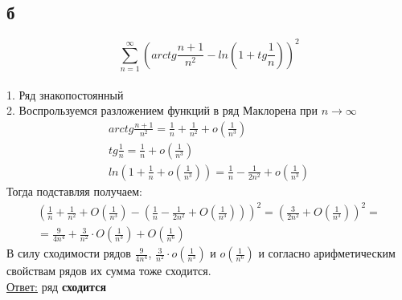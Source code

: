 \documentclass[a5paper, 10pt]{article}
\theoremstyle{definition}
\theoremstyle{plain}
\theoremstyle{remark}
\begin{document}
\subsection{б}
\begin{equation}
\sum \limits_{n = 1}^{\infty} \left( arctg \frac{n+1}{n^2} - ln \left(1+ tg \frac{1}{n} \right) \right)^2
\end{equation}
\\
1. Ряд знакопостоянный\\
2. Воспрользуемся разложением функций в ряд Маклорена при $n \to \infty$
\begin{gather*}
arctg \frac {n+1}{n^2} = \frac {1}{n} + \frac {1}{n^2}  + o\left( \frac{1}{n^3} \right) \\
tg \frac{1}{n} =  \frac {1}{n}  + o\left( \frac{1}{n^3} \right)\\
ln \left(1 +  \frac {1}{n}  + o\left( \frac{1}{n^3} \right)\right) =  \frac {1}{n} -  \frac{1}{2n^2}  + o\left( \frac{1}{n^3} \right)
\end{gather*}
Тогда подставляя получаем:
\begin{multline}
\left(  \frac {1}{n} + \frac {1}{n^2}  + O\left( \frac{1}{n^3} \right) - \left(  \frac {1}{n} -  \frac{1}{2n^2}  + O\left( \frac{1}{n^3} \right)\right) \right)^2 = \left(  \frac {3}{2n^2}  + O\left( \frac{1}{n^3} \right) \right)^2 =\\
= \frac{9}{4n^4} +  \frac{3}{n^2} \cdot  O\left( \frac{1}{n^3} \right)+ O\left( \frac{1}{n^6} \right)
\end{multline}
В силу сходимости рядов $\frac{9}{4n^4} $, $\frac{3}{n^2} \cdot  o\left( \frac{1}{n^3} \right)$ и $o\left( \frac{1}{n^6} \right)$ и согласно арифметическим свойствам рядов их сумма тоже сходится.\\

\underline{Ответ:} ряд  \textbf{сходится}


\newpage
\end{document}
